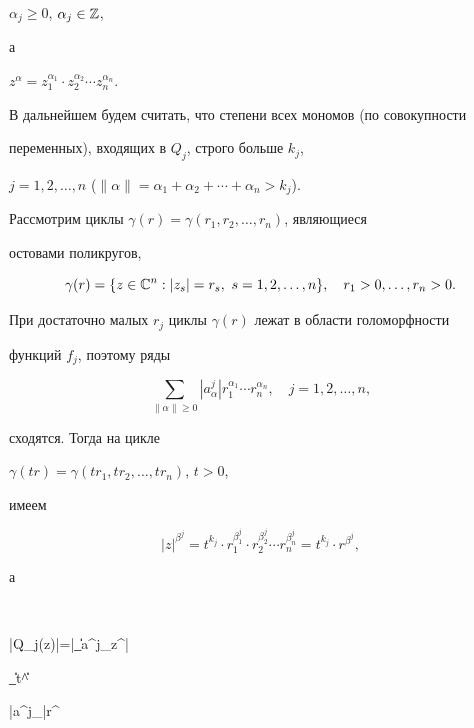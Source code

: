 $\alpha_j\geqslant 0$, $\alpha_j\in\Bbb Z$,


а


$z^\alpha=z_1^{\alpha_1}\cdot z_2^{\alpha_2}\dotsb z_n^{\alpha_n}$.





В дальнейшем будем считать, что степени всех мономов (по совокупности 


переменных), входящих в $Q_j$, строго больше $k_j$,


$j=1,2,\dotsc, n$ ($\|\alpha\|=


\alpha_1+\alpha_2+\dotsb +\alpha_n>k_j$).





Рассмотрим циклы $\gamma(r)=\gamma(r_1,r_2,\dotsc, r_n)$, являющиеся 


остовами поликругов,


$$


\gamma(r)=\{z\in\Bbb C^n:|z_s|=r_s,\ s=1,2,\dotsc,n\},


\quad r_1>0,\dotsc,r_n>0.


$$





При достаточно малых $r_j$ циклы $\gamma(r)$ лежат в области голоморфности


функций $f_j$, поэтому ряды


$$


\sum_{\|\alpha\|\geqslant 0}|a^j_\alpha |r_1^{\alpha_1}


\dotsb r^{\alpha_n}_n, \quad j=1,2,\dotsc, n,


$$


сходятся. Тогда на цикле 


$\gamma(tr)=\gamma(tr_1,tr_2,\dotsc,tr_n)$, $t>0$,


имеем


$$


|z|^{\beta^j}=t^{k_j}\cdot r_1^{\beta_1^j}\cdot r_2^{\beta_2^j}\dotsb


r_n^{\beta_n^j}=t^{k_j}\cdot r^{\beta^j},


$$


а


$$


|Q_j(z)|=\bigg|\sum_{\|\alpha\|}a^j_\alpha z^\alpha\bigg|


\leqslant\sum_{\|\alpha\|}t^{\|\alpha\|}


|a^j_\alpha|r^\alpha\leqslant


